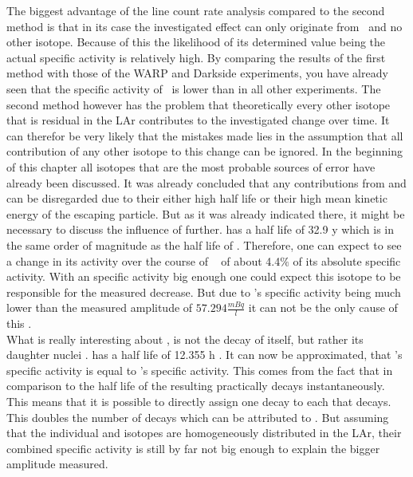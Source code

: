 \documentclass[encoding=utf8,british]{tumphthesis}
\begin{document}
The biggest advantage of the line count rate analysis compared to the second method is that in its case the investigated effect can only originate from \Kr\ and no other isotope.
Because of this the likelihood of its determined value being the actual specific activity is relatively high.
By comparing the results of the first method with those of the WARP and Darkside experiments, you have already seen that the specific activity of \Kr\ is lower than in all other experiments.
The second method however has the problem that theoretically every other isotope that is residual in the LAr contributes to the investigated change over time.
It can therefor be very likely that the mistakes made lies in the assumption that all contribution of any other isotope to this change can be ignored. 
In the beginning of this chapter all isotopes that are the most probable sources of error have already been discussed.
It was already concluded that any contributions from  and  can be disregarded due to their either high half life or their high mean kinetic energy of the escaping particle.
But as it was already indicated there, it might be necessary to discuss the influence of  further.
 has a half life of 32.9 y which is in the same order of magnitude as the half life of \Kr.
Therefore, one can expect to see a change in its activity over the course of \PII~ of about 4.4$\%$ of its absolute specific activity.
With an specific activity big enough one could expect this isotope to be responsible for the measured decrease.
But due to 's specific activity being much lower than the measured amplitude of $57.294 \frac{\unit{mBq}}{\unit{l}}$  it can not be the only cause of this .
\\

What is really interesting about , is not the decay of  itself, but rather its daughter nuclei .
 has a half life of 12.355 h \cite{chen_nuclear_2016}.
It can now be approximated, that 's specific activity is equal to 's specific activity.
This comes from the fact that in comparison to the half life of  the resulting  practically decays instantaneously.
This means that it is possible to directly assign one  decay to each  that decays.
This doubles the number of decays which can be attributed to .
But assuming that the individual  and  isotopes are homogeneously distributed in the LAr, their combined specific activity is still by far not big enough to explain the bigger amplitude measured.
\\
\end{document}
